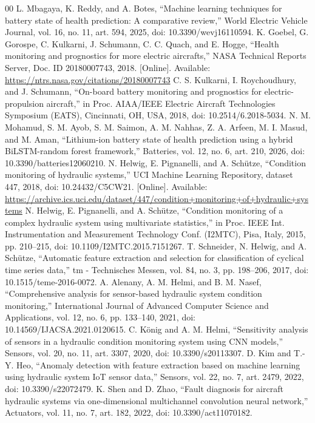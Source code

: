 \documentclass[conference]{IEEEtran}
\begin{document}
\begin{thebibliography}{00}
 L. Mbagaya, K. Reddy, and A. Botes, ``Machine learning techniques for battery state of health prediction: A comparative review,'' World Electric Vehicle Journal, vol. 16, no. 11, art. 594, 2025, doi: 10.3390/wevj16110594.
 K. Goebel, G. Gorospe, C. Kulkarni, J. Schumann, C. C. Quach, and E. Hogge, ``Health monitoring and prognostics for more electric aircrafts,'' NASA Technical Reports Server, Doc. ID 20180007743, 2018. [Online]. Available: \url{https://ntrs.nasa.gov/citations/20180007743}
 C. S. Kulkarni, I. Roychoudhury, and J. Schumann, ``On-board battery monitoring and prognostics for electric-propulsion aircraft,'' in Proc. AIAA/IEEE Electric Aircraft Technologies Symposium (EATS), Cincinnati, OH, USA, 2018, doi: 10.2514/6.2018-5034.
 N. M. Mohamud, S. M. Ayob, S. M. Saimon, A. M. Nahhas, Z. A. Arfeen, M. I. Masud, and M. Aman, ``Lithium-ion battery state of health prediction using a hybrid BiLSTM-random forest framework,'' Batteries, vol. 12, no. 6, art. 210, 2026, doi: 10.3390/batteries12060210.
 N. Helwig, E. Pignanelli, and A. Sch\"utze, ``Condition monitoring of hydraulic systems,'' UCI Machine Learning Repository, dataset 447, 2018, doi: 10.24432/C5CW21. [Online]. Available: \url{https://archive.ics.uci.edu/dataset/447/condition+monitoring+of+hydraulic+systems}
 N. Helwig, E. Pignanelli, and A. Sch\"utze, ``Condition monitoring of a complex hydraulic system using multivariate statistics,'' in Proc. IEEE Int. Instrumentation and Measurement Technology Conf. (I2MTC), Pisa, Italy, 2015, pp. 210--215, doi: 10.1109/I2MTC.2015.7151267.
 T. Schneider, N. Helwig, and A. Sch\"utze, ``Automatic feature extraction and selection for classification of cyclical time series data,'' tm - Technisches Messen, vol. 84, no. 3, pp. 198--206, 2017, doi: 10.1515/teme-2016-0072.
 A. Alenany, A. M. Helmi, and B. M. Nasef, ``Comprehensive analysis for sensor-based hydraulic system condition monitoring,'' International Journal of Advanced Computer Science and Applications, vol. 12, no. 6, pp. 133--140, 2021, doi: 10.14569/IJACSA.2021.0120615.
 C. K\"onig and A. M. Helmi, ``Sensitivity analysis of sensors in a hydraulic condition monitoring system using CNN models,'' Sensors, vol. 20, no. 11, art. 3307, 2020, doi: 10.3390/s20113307.
 D. Kim and T.-Y. Heo, ``Anomaly detection with feature extraction based on machine learning using hydraulic system IoT sensor data,'' Sensors, vol. 22, no. 7, art. 2479, 2022, doi: 10.3390/s22072479.
 K. Shen and D. Zhao, ``Fault diagnosis for aircraft hydraulic systems via one-dimensional multichannel convolution neural network,'' Actuators, vol. 11, no. 7, art. 182, 2022, doi: 10.3390/act11070182.

\end{thebibliography}
\end{document}
